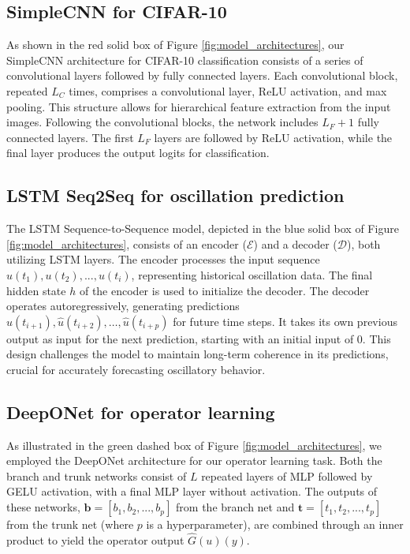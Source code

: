 \documentclass{article}
\theoremstyle{plain}
\theoremstyle{definition}
\theoremstyle{remark}
\begin{document}
\subsection{SimpleCNN for CIFAR-10}

As shown in the red solid box of Figure \ref{fig:model_architectures}, our SimpleCNN architecture for CIFAR-10 classification consists of a series of convolutional layers followed by fully connected layers.
Each convolutional block, repeated $L_C$ times, comprises a convolutional layer, ReLU activation, and max pooling.
This structure allows for hierarchical feature extraction from the input images.
Following the convolutional blocks, the network includes $L_F + 1$ fully connected layers.
The first $L_F$ layers are followed by ReLU activation, while the final layer produces the output logits for classification.

\subsection{LSTM Seq2Seq for oscillation prediction}

The LSTM Sequence-to-Sequence model, depicted in the blue solid box of Figure \ref{fig:model_architectures}, consists of an encoder ($\mathcal{E}$) and a decoder ($\mathcal{D}$), both utilizing LSTM layers.
The encoder processes the input sequence $u(t_1), u(t_2), ..., u(t_i)$, representing historical oscillation data.
The final hidden state $h$ of the encoder is used to initialize the decoder.
The decoder operates autoregressively, generating predictions $\hat{u}(t_{i+1}), \hat{u}(t_{i+2}), \ldots, \hat{u}(t_{i+p})$ for future time steps.
It takes its own previous output as input for the next prediction, starting with an initial input of 0.
This design challenges the model to maintain long-term coherence in its predictions, crucial for accurately forecasting oscillatory behavior.

\subsection{DeepONet for operator learning}

As illustrated in the green dashed box of Figure \ref{fig:model_architectures}, we employed the DeepONet architecture for our operator learning task.
Both the branch and trunk networks consist of $L$ repeated layers of MLP followed by GELU activation, with a final MLP layer without activation.
The outputs of these networks, $\mathbf{b} = [b_1, b_2, ..., b_p]$ from the branch net and $\mathbf{t} = [t_1, t_2, ..., t_p]$ from the trunk net (where $p$ is a hyperparameter), are combined through an inner product to yield the operator output $\hat{G}(u)(y)$.
\end{document}

